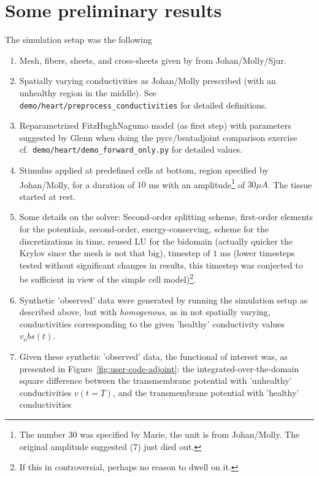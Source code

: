 \documentclass[a4paper, reqno]{amsart}
\numberwithin{equation}{section}
\begin{document}
\newpage
\section{Some preliminary results}

The simulation setup was the following
\begin{enumerate}
  \item
    Mesh, fibers, sheets, and cross-sheets given by from
    Johan/Molly/Sjur.
  \item
    Spatially varying conductivities as Johan/Molly
    prescribed (with an unhealthy region in the middle). See
    \texttt{demo/heart/preprocess\_conductivities} for detailed
    definitions.
  \item
    Reparametrized FitzHughNagumo model (as first step) with
    parameters suggested by Glenn when doing the pycc/beatadjoint
    comparison exercise cf.~\texttt{demo/heart/demo\_forward\_only.py}
    for detailed values.
  \item
    Stimulus applied at predefined cells at bottom, region specified
    by Johan/Molly, for a duration of $10$ ms with an
    amplitude\footnote{The number $30$ was specified by Marie, the
      unit is from Johan/Molly. The original amplitude suggested ($7$)
      just died out.} of $30 \mu A$. The tissue started at rest.
  \item
    Some details on the solver: Second-order splitting scheme,
    first-order elements for the potentials, second-order,
    energy-conserving, scheme for the discretizations in time, reused
    LU for the bidomain (actually quicker the Krylov since the mesh is
    not that big), timestep of $1$ ms (lower timesteps tested without
    significant changes in results, this timestep was conjected to be
    sufficient in view of the simple cell model)\footnote{If this in
      controversial, perhaps no reason to dwell on it.}.
  \item
    Synthetic 'observed' data were generated by running the simulation
    setup as described above, but with \emph{homogenous}, as in not
    spatially varying, conductivities corresponding to the given
    'healthy' conductivity values $v_obs(t)$.
  \item
    Given these synthetic 'observed' data, the functional of interest
    was, as presented in Figure~\ref{fig:user-code-adjoint}: the
    integrated-over-the-domain square difference between the
    transmembrane potential with 'unhealthy' conductivities $v(t =
    T)$, and the transmembrane potential with 'healthy' conductivities

\end{enumerate}
\end{document}
